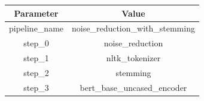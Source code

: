 \begin{tabular}{|c||c|}
\toprule
Parameter & Value \\ \midrule
\midrule
pipeline\_name & noise\_reduction\_with\_stemming \\ \midrule
step\_0 & noise\_reduction \\ \midrule
step\_1 & nltk\_tokenizer \\ \midrule
step\_2 & stemming \\ \midrule
step\_3 & bert\_base\_uncased\_encoder \\ \midrule
\bottomrule
\end{tabular}
